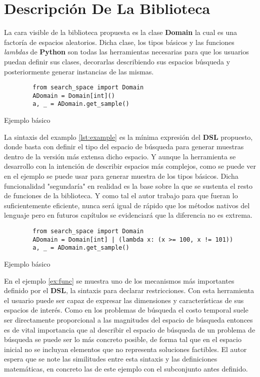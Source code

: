 \section{Descripción De La Biblioteca}

La cara visible de la biblioteca propuesta es la clase {\bf Domain} la cual es una factoría de espacios
aleatorios. Dicha clase, los tipos básicos y las funciones {\it lambdas} de {\bf Python} son todas
las herramientas necesarias para que los usuarios puedan definir sus clases, decorarlas describiendo
sus espacios búsqueda y posteriormente generar instancias de las mismas.


\begin{listing}[!ht]
    \begin{verbatim}
        from search_space import Domain
        ADomain = Domain[int]()
        a, _ = ADomain.get_sample()
    \end{verbatim}
    \caption{Ejemplo básico}
    \label{lst:example}
\end{listing}





La sintaxis del examplo \ref{lst:example} es la mínima expresión del {\bf DSL} propuesto, donde basta con
definir el tipo del espacio de búsqueda para generar muestras dentro de la versión más extensa dicho
espacio. Y aunque la herramienta se desarrollo con la intención de describir espacios más complejos,
como se puede ver en el ejemplo se puede usar para generar muestra de los tipos básicos. Dicha
funcionalidad "segundaría" en realidad es la base sobre la que se sustenta el resto de funciones de la
biblioteca. Y como tal el autor trabajo para que fueran lo suficientemente eficiente, nunca será igual
de rápido que los métodos nativos del lenguaje pero en futuros capítulos se evidenciará que la diferencia
no es extrema.

\begin{listing}[!ht]
    \begin{verbatim}
        from search_space import Domain
        ADomain = Domain[int] | (lambda x: (x >= 100, x != 101))
        a, _ = ADomain.get_sample()
    \end{verbatim}
    \caption{Ejemplo básico}
    \label{ex:func}
\end{listing}


En el ejemplo \ref{ex:func} se muestra uno de los mecanismos más importantes definido por el
    {\bf DSL}, la sintaxis para declarar restricciones. Con esta herramienta el usuario puede ser capaz de
expresar las dimensiones y características de sus espacios de interés. Como en los problemas de búsqueda el
costo temporal suele ser directamente proporcional a las magnitudes del espacio de búsqueda entonces es de
vital importancia que al describir el espacio de búsqueda de un problema de búsqueda se puede ser lo más
concreto posible, de forma tal que en el espacio inicial no se incluyan elementos que no representa soluciones
factibles. El autor espera que se note las similitudes entre esta sintaxis y las definiciones matemáticas, en
concreto las de este ejemplo con el subconjunto antes definido.


